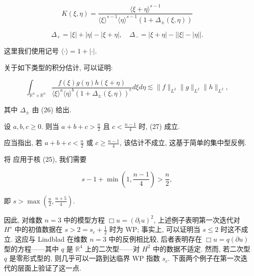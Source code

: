 \begin{equation}
K (\xi ,  \eta) = \frac {\langle \xi + \eta \rangle ^ {s - 1}}{\langle \xi \rangle ^ {s - 1} \langle \eta \rangle ^ {s - 1} \left(1 + \Delta_ {\pm} (\xi ,  \eta)\right)}\label{eq:cG-25}
\end{equation}

\begin{equation}
\Delta_ {+} = | \xi | + | \eta | - | \xi + \eta |,  \quad \Delta_ {-} = | \xi + \eta | - \left| | \xi | - | \eta | \right|.\label{eq:cG-26}
\end{equation}

这里我们使用记号 $\langle\cdot\rangle=1+|\cdot|$. 

关于如下类型的积分估计, 可以证明:

\begin{equation}
\int_ {\mathbb {R} ^ {n} \times \mathbb {R} ^ {n}} \frac {f (\xi) g (\eta) h (\xi + \eta)}{\langle \xi \rangle ^ {a} \langle \eta \rangle ^ {b} (1 + \Delta_ {\pm} (\xi ,  \eta)) ^ {c}} d \xi d \eta \lesssim \| f \| _ {L ^ {2}} \| g \| _ {L ^ {2}} \| h \| _ {L ^ {2}}, \label{eq:cG-27}
\end{equation}

其中 $\Delta_{\pm}$ 由 (26) 给出. 

\begin{proposition}\label{prop:cG-2.6}
设 $a,  b,  c \geq 0$. 则当 $a + b + c > \frac{n}{2}$ 且 $c < \frac{n-1}{4}$ 时, (27) 成立. 
\end{proposition}

\begin{remark}\label{rem:cG-2.7}
应当指出, 若 $a + b + c < \frac{n}{2}$ 或 $c \geq \frac{n-1}{4}$, 该估计不成立, 这基于简单的集中型反例. 
\end{remark}

将 应用于核 (25), 我们需要

\[
s - 1 + \min \left(1,  \frac {n - 1}{4}\right) > \frac {n}{2}, 
\]

即 $s > \max \left( \frac{n}{2},  \frac{n+5}{4} \right)$. 

因此, 对维数 $n = 3$ 中的模型方程 $\Box u = (\partial_t u)^2$, 上述例子表明第一次迭代对 $H^s$ 中的初值数据在 $s > 2 = s_c + \frac{1}{2}$ 时为 WP; 事实上, 可以证明当 $s \leq 2$ 时这不成立. 这应与 Lindblad \cite{gfref49} 在维数 $n = 3$ 中的反例相比较, 后者表明存在 $\Box u = q(\partial u)$ 型的方程——其中 $q$ 是 $\mathbb{R}^4$ 上的二次型——对 $H^2$ 中的数据不适定. 然而, 若二次型 $q$ 是零形式型的, 则几乎可以一路到达临界 WP 指数 $s_c$. 下面两个例子在第一次迭代的层面上验证了这一点. 

